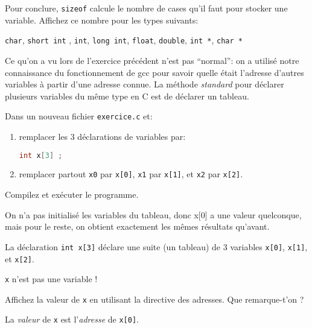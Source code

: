 \question Pour conclure, \texttt{sizeof} calcule le nombre de cases
qu'il faut pour stocker une variable. Affichez ce nombre pour les types suivants:
\begin{center}
  \texttt{char}, \texttt{short int} , \texttt{int}, \texttt{long int}, \texttt{float}, \texttt{double}, \texttt{int *}, \texttt{char *}
\end{center}



Ce qu'on a vu lors de l'exercice précédent n'est pas ``normal'': on a
utilisé notre connaissance du fonctionnement de gcc pour savoir quelle
était l'adresse d'autres variables à partir d'une adresse connue. La
méthode \emph{standard} pour déclarer plusieurs variables du même type
en C est de déclarer un tableau.

\question Dans un nouveau fichier
\texttt{exercice\label{exercicenum}.c} et:
\begin{enumerate}
\item remplacer les 3 déclarations de variables par:
  \begin{lstlisting}[language=C]
    int x[3] ;
  \end{lstlisting}
\item remplacer partout \texttt{x0} par \texttt{x[0]}, \texttt{x1} par
  \texttt{x[1]}, et \texttt{x2} par \texttt{x[2]}.
\end{enumerate}
Compilez et exécuter le programme.

\begin{solutioncachee}
  On n'a pas initialisé les variables du tableau, donc x[0] a une
  valeur quelconque, mais pour le reste, on obtient exactement les
  mêmes résultats qu'avant.
\end{solutioncachee}

\begin{fminipage}{0.9\textwidth}
  La déclaration \texttt{int x[3]} déclare une suite (un tableau) de 3
  variables \texttt{x[0]}, \texttt{x[1]}, et \texttt{x[2]}.

  \large \texttt{x} n'est pas une variable !
\end{fminipage}

\question Affichez la valeur de \texttt{x} en utilisant la directive
des adresses. Que remarque-t'on ?

\begin{solutioncachee}
  La \emph{valeur} de \texttt{x} est l'\emph{adresse} de \texttt{x[0]}.
\end{solutioncachee}


